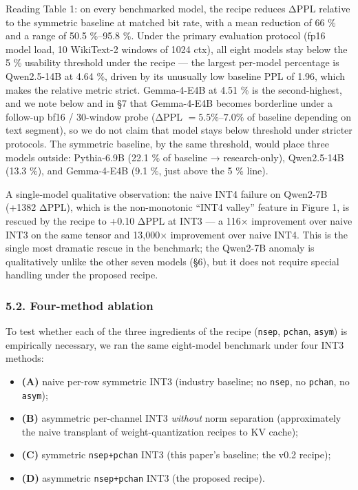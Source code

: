 Reading Table 1: on every benchmarked model, the recipe reduces ΔPPL
relative to the symmetric baseline at matched bit rate, with a mean
reduction of 66 \% and a range of 50.5 \%--95.8 \%. Under the primary
evaluation protocol (fp16 model load, 10 WikiText-2 windows of 1024
ctx), all eight models stay below the 5 \% usability threshold under the
recipe --- the largest per-model percentage is Qwen2.5-14B at 4.64 \%,
driven by its unusually low baseline PPL of 1.96, which makes the
relative metric strict. Gemma-4-E4B at 4.51 \% is the second-highest,
and we note below and in §7 that Gemma-4-E4B becomes borderline under a
follow-up bf16 / 30-window probe (ΔPPL \(= 5.5\%\)--\(7.0\%\) of
baseline depending on text segment), so we do not claim that model stays
below threshold under stricter protocols. The symmetric baseline, by the
same threshold, would place three models outside: Pythia-6.9B (22.1 \%
of baseline → research-only), Qwen2.5-14B (13.3 \%), and Gemma-4-E4B
(9.1 \%, just above the 5 \% line).

A single-model qualitative observation: the naive INT4 failure on
Qwen2-7B (+1382 ΔPPL), which is the non-monotonic ``INT4 valley''
feature in Figure 1, is rescued by the recipe to +0.10 ΔPPL at INT3 ---
a 116× improvement over naive INT3 on the same tensor and 13,000×
improvement over naive INT4. This is the single most dramatic rescue in
the benchmark; the Qwen2-7B anomaly is qualitatively unlike the other
seven models (§6), but it does not require special handling under the
proposed recipe.

\subsubsection{5.2. Four-method ablation}\label{four-method-ablation}

To test whether each of the three ingredients of the recipe
(\texttt{nsep}, \texttt{pchan}, \texttt{asym}) is empirically necessary,
we ran the same eight-model benchmark under four INT3 methods:

\begin{itemize}
\tightlist
\item
  \textbf{(A)} naive per-row symmetric INT3 (industry baseline; no
  \texttt{nsep}, no \texttt{pchan}, no \texttt{asym});
\item
  \textbf{(B)} asymmetric per-channel INT3 \emph{without} norm
  separation (approximately the naive transplant of weight-quantization
  recipes to KV cache);
\item
  \textbf{(C)} symmetric \texttt{nsep+pchan} INT3 (this paper's
  baseline; the v0.2 recipe);
\item
  \textbf{(D)} asymmetric \texttt{nsep+pchan} INT3 (the proposed
  recipe).
\end{itemize}

